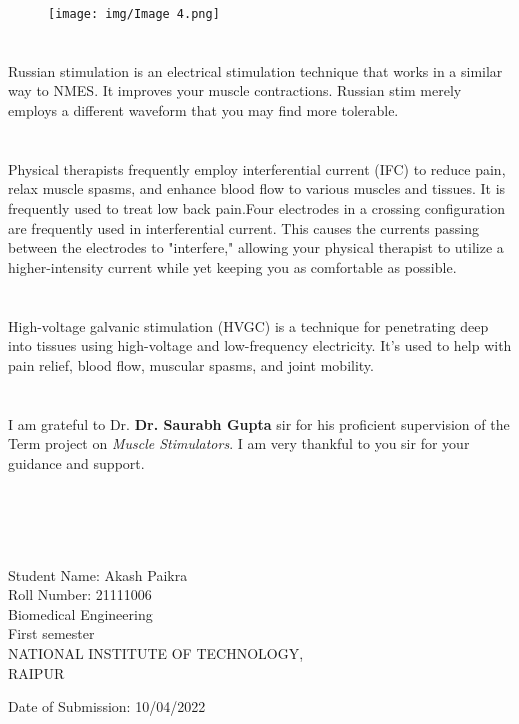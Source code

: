 \documentclass[11pt]{article}
\begin{document}
\begin{figure}[H]
    \centering
    \texttt{[image: img/Image 4.png]}
    \caption{}
    \label{fig:bad_images}
\end{figure}
\section{}
Russian stimulation is an electrical stimulation technique that works in a similar way to NMES. It improves your muscle contractions. Russian stim merely employs a different waveform that you may find more tolerable.


\section{}
Physical therapists frequently employ interferential current (IFC) to reduce pain, relax muscle spasms, and enhance blood flow to various muscles and tissues. It is frequently used to treat low back pain.Four electrodes in a crossing configuration are frequently used in interferential current. This causes the currents passing between the electrodes to "interfere," allowing your physical therapist to utilize a higher-intensity current while yet keeping you as comfortable as possible.

\section{}
High-voltage galvanic stimulation (HVGC) is a technique for penetrating deep into tissues using high-voltage and low-frequency electricity. It's used to help with pain relief, blood flow, muscular spasms, and joint mobility.


\newpage
\section{}\vspace*{1\baselineskip}
I am grateful to Dr. \textbf{Dr. Saurabh Gupta} sir for his proficient supervision of the Term project on \emph{Muscle Stimulators}. I am very thankful to you sir for your guidance and support.\\\\\\\\\
\vspace*{13\baselineskip}
\begin{flushright}
Student Name: Akash Paikra\\
Roll Number: 21111006\\
Biomedical Engineering\\
First semester\\
NATIONAL INSTITUTE OF TECHNOLOGY,\\
RAIPUR
\end{flushright}
\vspace*{4\baselineskip}
Date of Submission: 10/04/2022 
\end{document}

